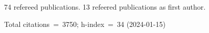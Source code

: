 74 refereed publications. 13 refeered publications as first author.

Total citations~=~3750; h-index~=~34 (2024-01-15)